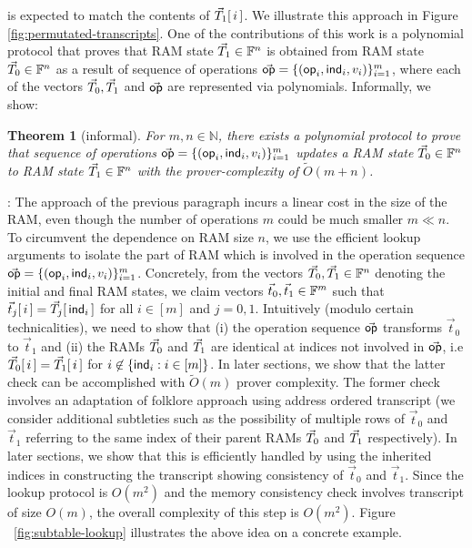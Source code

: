 \documentclass[sigconf]{acmart}
\newtheorem{theorem}{Theorem}[section]
\begin{document}
is expected to match the contents of $\vec{T}_1[\,i\,]$. We illustrate this approach in Figure \ref{fig:permutated-transcripts}. One of the contributions of this work is a polynomial protocol that proves that RAM state
$\vec{T}_1\in \mathbb{F}^n$ is obtained from RAM state $\vec{T}_0\in \mathbb{F}^n$ as a result of sequence of operations $\vec{\mathsf{op}}=\{(\mathsf{op}_i,\mathsf{ind}_i,v_i)\}_{i=1}^m$, where each
of the vectors $\vec{T}_0,\vec{T}_1$ and $\vec{\mathsf{op}}$ are represented via polynomials. Informally, we show:
\begin{theorem}[informal]\label{thm:pp-for-ram-informal}
	For $m,n\in \mathbb{N}$, there exists a polynomial protocol to prove that sequence of operations $\vec{\mathsf{op}}=\{(\mathsf{op}_i,\mathsf{ind}_i,v_i)\}_{i=1}^m$ updates a
	RAM state $\vec{T}_0\in \mathbb{F}^n$ to RAM state $\vec{T}_1\in \mathbb{F}^n$ with the prover-complexity of $\tilde{O}(m+n)$.
\end{theorem}

: The approach of the previous paragraph incurs a linear cost in
the size of the RAM, even though the number of operations $m$ could be much smaller $m\ll n$. To circumvent the
dependence on RAM size $n$, we use the efficient lookup arguments to isolate the part of RAM which is involved
in the operation sequence $\vec{\mathsf{op}}=\{(\mathsf{op}_i,\mathsf{ind}_i,v_i)\}_{i=1}^m$.
Concretely, from the vectors $\vec{T}_0,\vec{T}_1\in \mathbb{F}^n$ denoting the initial and final RAM states, we claim
vectors $\vec{t}_0, \vec{t}_1\in \mathbb{F}^m$ such that $\vec{t}_j[\,i\,] = \vec{T}_j[\,\mathsf{ind}_i\,]$ for all $i\in [m]$ and
$j=0,1$. Intuitively (modulo certain technicalities), we need to show that (i) the operation sequence $\vec{\mathsf{op}}$
transforms $\vec{t}_0$ to $\vec{t}_1$ and (ii) the RAMs $\vec{T}_0$ and $\vec{T}_1$ are identical at indices not
involved in $\vec{\mathsf{op}}$, i.e $\vec{T}_0[\,i\,]=\vec{T}_1[\,i\,]$ for $i\not\in \{\mathsf{ind}_i: i\in [m]\}$. In later
sections, we show that the latter check can be accomplished with $\tilde{O}(m)$ prover complexity. The former
check involves an adaptation of folklore approach using address ordered transcript (we consider additional subtleties such
as the possibility of multiple rows of $\vec{t}_0$ and $\vec{t}_1$ referring to the same index of their parent RAMs $\vec{T}_0$ and
$\vec{T}_1$ respectively).
In later sections, we show that this is efficiently handled by using the inherited indices in constructing the transcript showing
consistency of $\vec{t}_0$ and $\vec{t}_1$. Since the lookup protocol is $O(m^2)$ and the memory consistency check involves transcript
of size $O(m)$, the overall complexity of this step is $O(m^2)$. Figure ~\ref{fig:subtable-lookup} illustrates the above idea on
a concrete example.
\end{document}
